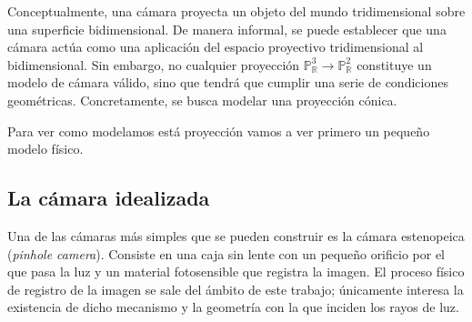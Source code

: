 \documentclass[
10pt, %
a4paper, %
oneside, %
headinclude,footinclude, %
BCOR=5mm, %
]{scrartcl}
\begin{document}
Conceptualmente, una cámara proyecta un objeto del mundo tridimensional sobre una superficie bidimensional. De manera informal, se puede establecer que una cámara actúa como una aplicación del espacio proyectivo tridimensional al bidimensional. Sin embargo, no cualquier proyección $\mathbb{P}^3_\mathbb{R} \rightarrow \mathbb{P}^2_\mathbb{R}$ constituye un modelo de cámara válido, sino que tendrá que cumplir una serie de condiciones geométricas. Concretamente, se busca modelar una proyección cónica.

Para ver como modelamos está proyección vamos a ver primero un pequeño modelo físico.

\subsection{La cámara idealizada}

Una de las cámaras más simples que se pueden construir es la cámara estenopeica (\textit{pinhole camera}). Consiste en una caja sin lente con un pequeño orificio por el que pasa la luz y un material fotosensible que registra la imagen. El proceso físico de registro de la imagen se sale del ámbito de este trabajo; únicamente interesa la existencia de dicho mecanismo y la geometría con la que inciden los rayos de luz.
\end{document}
